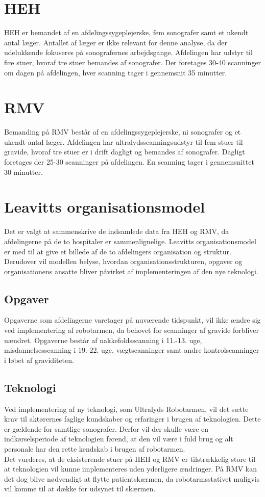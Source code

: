 \section{HEH}
HEH er bemandet af en afdelingssygeplejerske, fem sonografer samt et ukendt antal læger. Antallet af læger er ikke relevant for denne analyse, da der udelukkende fokuseres på sonografernes arbejdsgange.
Afdelingen har udstyr til fire stuer, hvoraf tre stuer bemandes af sonografer. Der foretages 30-40 scanninger om dagen på afdelingen, hver scanning tager i gennemsnit 35 minutter.

\section{RMV}
Bemanding på RMV består af en afdelingssygeplejerske, ni sonografer og et ukendt antal læger. Afdelingen har ultralydsscanningsudstyr til fem stuer til gravide, hvoraf tre stuer er i drift dagligt og bemandes af sonografer. Dagligt foretages der 25-30 scanninger på afdelingen. En scanning tager i gennemsnittet 30 minutter.


\section{Leavitts organisationsmodel}
Det er valgt at sammenskrive de indsamlede data fra HEH og RMV, da afdelingerne på de to hospitaler er sammenlignelige. Leavitts organisationsmodel er med til at give et billede af de to afdelingers organisation og struktur. Derudover vil modellen belyse, hvordan organisationsstrukturen, opgaver og organisationens ansatte bliver påvirket af implementeringen af den nye teknologi. \cite{Leavitt} \cite{diamantmodel} 


\subsection{Opgaver}
Opgaverne som afdelingerne varetager på nuværende tidspunkt, vil ikke ændre sig ved implementering af robotarmen, da behovet for scanninger af gravide forbliver uændret. Opgaverne består af nakkefoldsscanning i 11.-13. uge, misdannelsesscanning i 19.-22. uge, vægtscanninger samt andre kontrolscanninger i løbet af graviditeten. \cite{graviditet} 

\subsection{Teknologi}
Ved implementering af ny teknologi, som Ultralyds Robotarmen, vil det sætte krav til aktørernes faglige kundskaber og erfaringer i brugen af teknologien. Dette er gældende for samtlige sonografer. Derfor vil der skulle være en indkørselsperiode af teknologien førend, at den vil være i fuld brug og alt personale har den rette kendskab i brugen af robotarmen. \\
Det vurderes, at de eksisterende stuer på HEH og RMV er tilstrækkelig store til at teknologien vil kunne implementeres uden yderligere ændringer. På RMV kan det dog blive nødvendigt at flytte patientskærmen, da robotarmsstativet muligvis vil komme til at dække for udsynet til skærmen.  

